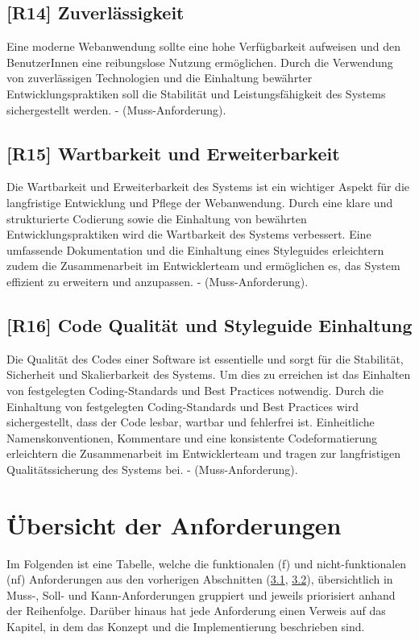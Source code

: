 \subsection{[R14] Zuverlässigkeit}

Eine moderne Webanwendung sollte eine hohe Verfügbarkeit aufweisen und den BenutzerInnen eine reibungslose Nutzung ermöglichen.
Durch die Verwendung von zuverlässigen Technologien und die Einhaltung bewährter Entwicklungspraktiken soll die Stabilität und Leistungsfähigkeit des Systems sichergestellt werden.
- (Muss-Anforderung).

\subsection{[R15] Wartbarkeit und Erweiterbarkeit}

Die Wartbarkeit und Erweiterbarkeit des Systems ist ein wichtiger Aspekt für die langfristige Entwicklung und Pflege der Webanwendung.
Durch eine klare und strukturierte Codierung sowie die Einhaltung von bewährten Entwicklungspraktiken wird die Wartbarkeit des Systems verbessert.
Eine umfassende Dokumentation und die Einhaltung eines Styleguides erleichtern zudem die Zusammenarbeit im Entwicklerteam und ermöglichen es, das System effizient zu erweitern und anzupassen.
- (Muss-Anforderung).

\subsection{[R16] Code Qualität und Styleguide Einhaltung}

Die Qualität des Codes einer Software ist essentielle und sorgt für die Stabilität, Sicherheit und Skalierbarkeit des Systems.
Um dies zu erreichen ist das Einhalten von festgelegten Coding-Standards und Best Practices notwendig.
Durch die Einhaltung von festgelegten Coding-Standards und Best Practices wird sichergestellt, dass der Code lesbar, wartbar und fehlerfrei ist.
Einheitliche Namenskonventionen, Kommentare und eine konsistente Codeformatierung erleichtern die Zusammenarbeit im Entwicklerteam und tragen zur langfristigen Qualitätssicherung des Systems bei.
- (Muss-Anforderung).

\section{Übersicht der Anforderungen}
\label{chapter:3-section:uebersicht-anforderungen}

Im Folgenden ist eine Tabelle, welche die funktionalen (f) und nicht-funktionalen (nf) Anforderungen aus den vorherigen Abschnitten (\hyperref[chapter:3-section:funktionale-anforderungen]{3.1}, \hyperref[chapter:3-section:nichtfunktionale-anforderungen]{3.2}), übersichtlich in Muss-, Soll- und Kann-Anforderungen gruppiert und jeweils priorisiert anhand der Reihenfolge.
Darüber hinaus hat jede Anforderung einen Verweis auf das Kapitel, in dem das Konzept und die Implementierung beschrieben sind.

